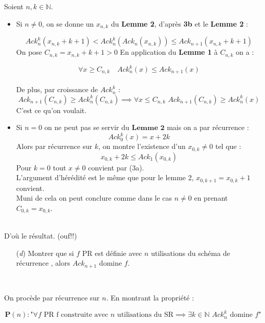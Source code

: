 \documentclass[12pt,letterpaper,boxed]{hmcpset}
\newcommand{\property}{\mathbf{P}}
\begin{document}
\begin{solution}
\begin{solution}[(c)]
\noindent Soient $n,k \in \mathbb{N}$. \\
\begin{itemize}
\item
Si $n \neq 0$, on se donne un $x_{n,k}$ du \textbf{Lemme 2}, d'après \textbf{3b} et le \textbf{Lemme 2}  : 

$$  Ack^{k}_{n}(x_{n,k}+k+1) < Ack^{k}_{n}(Ack_{n}(x_{n,k})) \leq Ack_{n+1}(x_{n,k}+k+1)$$
On pose $C_{n,k} = x_{n,k} + k + 1 > 0$
En application du \textbf{Lemme 1} à $C_{n,k}$ on a : 

$$ \forall x \geq C_{n,k} \quad Ack^{k}_{n}(x) \leq Ack_{n+1}(x)$$
\ \\
De plus, par croissance de $Ack^{k}_{n}$ :  $$Ack_{n+1}(C_{n,k}) \geq Ack^{k}_{n}(C_{n,k}) \implies \forall x \leq C_{n,k} 
\, \, Ack_{n+1}(C_{n,k}) \geq Ack^{k}_{n}(x)
$$
C'est ce qu'on voulait. \\
\item Si $n = 0$ on ne peut pas se servir du $\textbf{Lemme 2}$ mais on a par récurrence : 
$$ Ack^{k}_{0}(x) = x+2k$$
\noindent Alors par récurrence sur $k$, on montre l'existence d'un $x_{0,k} \neq 0$ tel que :
$$x_{0,k} + 2k \leq Ack_{1}(x_{0,k})$$
Pour $k=0$ tout $x \neq 0$ convient par (3a). \\
L'argument d'hérédité est le même que pour le lemme 2, $x_{0,k+1}=x_{0,k}+1$ convient. \\
Muni de cela on peut conclure comme dans le cas $n \neq 0$ en prenant $C_{0,k}=x_{0,k}$. 
\end{itemize}
\ \\
D'où le résultat. (ouf!!)
\end{solution}

\begin{problem}
\begin{itemize}  
  \item[(\textit{d})]  Montrer que si $f$ PR est définie avec $n$ utilisations du 
  schéma de récurrence , alors $Ack_{n+1}$ domine $f$.
 \end{itemize}
 \end{problem}
 
 \ \\
 \begin{solution}[(d)]
\noindent On procède par récurrence sur $n$. En montrant la propriété : 

$$ 
\property(n) : \text{"} \forall f \text{  PR  } \text{f construite avec } n \text{ utilisations du SR} \implies
\exists k \in \mathbb{N} \, \, Ack^{k}_{n} \text{ domine } f \text{"}
$$
\newpage


\end{solution}
\end{solution}
\end{document}
